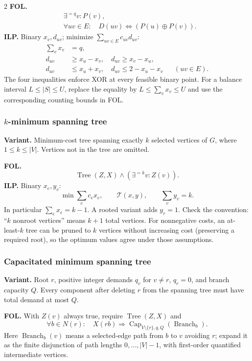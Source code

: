 \documentclass[8pt]{extarticle}
\theoremstyle{definition}
\begin{document}
\begin{multicols*}{2}
\textbf{FOL.}
\[
\begin{aligned}
 &\exists^{=q}v:P(v),\\
 &\forall uv\in E:\quad D(uv)\Leftrightarrow(P(u)\mathbin\oplus P(v)).
\end{aligned}
\]
\textbf{ILP.} Binary $x_v,d_{uv}$; minimize $\sum_{uv\in E}c_{uv}d_{uv}$:
\[
\begin{aligned}
 \sum_v x_v&=q,\\
 d_{uv}&\ge x_u-x_v,\quad d_{uv}\ge x_v-x_u,\\
 d_{uv}&\le x_u+x_v,\quad d_{uv}\le2-x_u-x_v
                         &&(uv\in E).
\end{aligned}
\]
The four inequalities enforce XOR at every feasible binary point.
For a balance interval $L\le |S|\le U$, replace the equality by
$L\le\sum_vx_v\le U$ and use the corresponding counting bounds in FOL.

\subsubsection{\texorpdfstring{$k$}{k}-minimum spanning tree}\label{form:kmst}
\textbf{Variant.} Minimum-cost tree spanning exactly $k$ selected vertices
of $G$, where $1\le k\le |V|$. Vertices not in the tree are omitted.

\textbf{FOL.}
\[
 \operatorname{Tree}(Z,X)\land(\exists^{=k}v:Z(v)).
\]
\textbf{ILP.} Binary $x_e,y_v$:
\[
 \min\sum_e c_ex_e,\qquad
 \mathcal T(x,y),\qquad \sum_v y_v=k.
\]
In particular $\sum_ex_e=k-1$. A rooted variant adds $y_r=1$.
Check the convention: ``$k$ nonroot vertices'' means $k+1$ total vertices.
For nonnegative costs, an at-least-$k$ tree can be pruned to $k$ vertices
without increasing cost (preserving a required root), so the optimum values
agree under those assumptions.

\subsubsection{Capacitated minimum spanning tree}\label{form:cmst}
\textbf{Variant.} Root $r$, positive integer demands $q_v$ for $v\ne r$,
$q_r=0$, and branch capacity $Q$. Every component after deleting $r$ from
the spanning tree must have total demand at most $Q$.

\textbf{FOL.} With $Z(v)$ always true, require $\operatorname{Tree}(Z,X)$ and
\[
 \forall b\in N(r):\quad X(rb)\Rightarrow
 \operatorname{Cap}_{V\setminus\{r\},q,Q}(\operatorname{Branch}_b).
\]
Here $\operatorname{Branch}_b(v)$ means a selected-edge path from $b$ to $v$
avoiding $r$; expand it as the finite disjunction of path lengths
$0,\ldots,|V|-1$, with first-order quantified intermediate vertices.


\end{multicols*}
\end{document}
